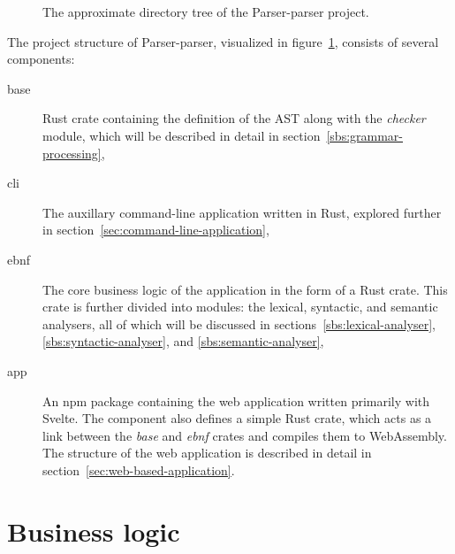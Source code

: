 \documentclass[english,engineering]{wizthesis}
\newcommand{\thisproject}{Parser-parser}
\begin{document}
\begin{figure}[H]
  \centering
  \caption{The approximate directory tree of the \thisproject{} project.}
  \label{fig:file-tree}
\end{figure}

The project structure of \thisproject{}, visualized in
figure~\ref{fig:file-tree}, consists of several components:
\begin{description}
  \item[base] Rust crate containing the definition of the AST along with the
  \emph{checker} module, which will be described in detail in
  section~\ref{sbs:grammar-processing},
  \item[cli] The auxillary command-line application written in Rust, explored
  further in section~\ref{sec:command-line-application},
  \item[ebnf] The core business logic of the application in the form of a Rust
  crate. This crate is further divided into modules: the lexical, syntactic, and
  semantic analysers, all of which will be discussed in
  sections~\ref{sbs:lexical-analyser}, \ref{sbs:syntactic-analyser}, and
  \ref{sbs:semantic-analyser},
  \item[app] An npm package containing the web application written primarily
  with Svelte. The component also defines a simple Rust crate, which acts as a
  link between the \emph{base} and \emph{ebnf} crates and compiles them to
  WebAssembly. The structure of the web application is described in detail in
  section~\ref{sec:web-based-application}.
\end{description}

\section{Business logic} \label{sec:business-logic}
\end{document}
